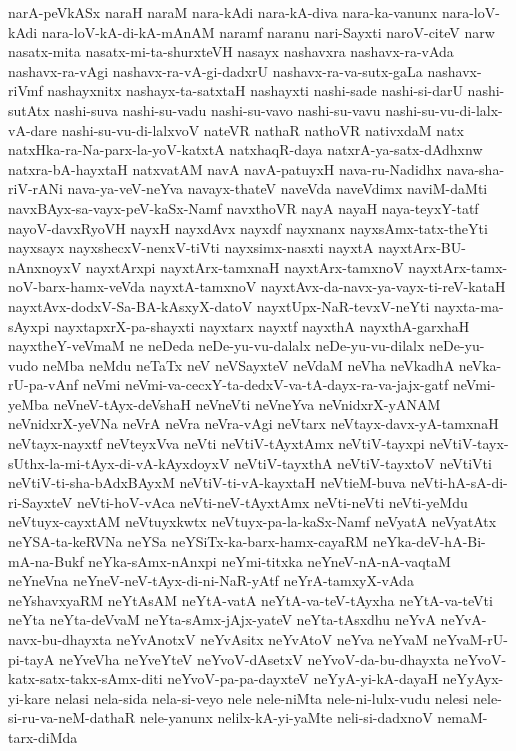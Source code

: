 {narA-peVkASx
naraH
naraM
nara-kAdi
nara-kA-diva
nara-ka-vanunx
nara-loV-kAdi
nara-loV-kA-di-kA-mAnAM
naramf
naranu
nari-Sayxti
naroV-citeV
narw
nasatx-mita
nasatx-mi-ta-shurxteVH
nasayx
nashavxra
nashavx-ra-vAda
nashavx-ra-vAgi
nashavx-ra-vA-gi-dadxrU
nashavx-ra-va-sutx-gaLa
nashavx-riVmf
nashayxnitx
nashayx-ta-satxtaH
nashayxti
nashi-sade
nashi-si-darU
nashi-sutAtx
nashi-suva
nashi-su-vadu
nashi-su-vavo
nashi-su-vavu
nashi-su-vu-di-lalx-vA-dare
nashi-su-vu-di-lalxvoV
nateVR
nathaR
nathoVR
nativxdaM
natx
natxHka-ra-Na-parx-la-yoV-katxtA
natxhaqR-daya
natxrA-ya-satx-dAdhxnw
natxra-bA-hayxtaH
natxvatAM
navA
navA-patuyxH
nava-ru-Nadidhx
nava-sha-riV-rANi
nava-ya-veV-neYva
navayx-thateV
naveVda
naveVdimx
naviM-daMti
navxBAyx-sa-vayx-peV-kaSx-Namf
navxthoVR
nayA
nayaH
naya-teyxY-tatf
nayoV-davxRyoVH
nayxH
nayxdAvx
nayxdf
nayxnanx
nayxsAmx-tatx-theYti
nayxsayx
nayxshecxV-nenxV-tiVti
nayxsimx-nasxti
nayxtA
nayxtArx-BU-nAnxnoyxV
nayxtArxpi
nayxtArx-tamxnaH
nayxtArx-tamxnoV
nayxtArx-tamx-noV-barx-hamx-veVda
nayxtA-tamxnoV
nayxtAvx-da-navx-ya-vayx-ti-reV-kataH
nayxtAvx-dodxV-Sa-BA-kAsxyX-datoV
nayxtUpx-NaR-tevxV-neYti
nayxta-ma-sAyxpi
nayxtapxrX-pa-shayxti
nayxtarx
nayxtf
nayxthA
nayxthA-garxhaH
nayxtheY-veVmaM
ne
neDeda
neDe-yu-vu-dalalx
neDe-yu-vu-dilalx
neDe-yu-vudo
neMba
neMdu
neTaTx
neV
neVSayxteV
neVdaM
neVha
neVkadhA
neVka-rU-pa-vAnf
neVmi
neVmi-va-cecxY-ta-dedxV-va-tA-dayx-ra-va-jajx-gatf
neVmi-yeMba
neVneV-tAyx-deVshaH
neVneVti
neVneYva
neVnidxrX-yANAM
neVnidxrX-yeVNa
neVrA
neVra
neVra-vAgi
neVtarx
neVtayx-davx-yA-tamxnaH
neVtayx-nayxtf
neVteyxVva
neVti
neVtiV-tAyxtAmx
neVtiV-tayxpi
neVtiV-tayx-sUthx-la-mi-tAyx-di-vA-kAyxdoyxV
neVtiV-tayxthA
neVtiV-tayxtoV
neVtiVti
neVtiV-ti-sha-bAdxBAyxM
neVtiV-ti-vA-kayxtaH
neVtieM-buva
neVti-hA-sA-di-ri-SayxteV
neVti-hoV-vAca
neVti-neV-tAyxtAmx
neVti-neVti
neVti-yeMdu
neVtuyx-cayxtAM
neVtuyxkwtx
neVtuyx-pa-la-kaSx-Namf
neVyatA
neVyatAtx
neYSA-ta-keRVNa
neYSa
neYSiTx-ka-barx-hamx-cayaRM
neYka-deV-hA-Bi-mA-na-Bukf
neYka-sAmx-nAnxpi
neYmi-titxka
neYneV-nA-nA-vaqtaM
neYneVna
neYneV-neV-tAyx-di-ni-NaR-yAtf
neYrA-tamxyX-vAda
neYshavxyaRM
neYtAsAM
neYtA-vatA
neYtA-va-teV-tAyxha
neYtA-va-teVti
neYta
neYta-deVvaM
neYta-sAmx-jAjx-yateV
neYta-tAsxdhu
neYvA
neYvA-navx-bu-dhayxta
neYvAnotxV
neYvAsitx
neYvAtoV
neYva
neYvaM
neYvaM-rU-pi-tayA
neYveVha
neYveYteV
neYvoV-dAsetxV
neYvoV-da-bu-dhayxta
neYvoV-katx-satx-takx-sAmx-diti
neYvoV-pa-pa-dayxteV
neYyA-yi-kA-dayaH
neYyAyx-yi-kare
nelasi
nela-sida
nela-si-veyo
nele
nele-niMta
nele-ni-lulx-vudu
nelesi
nele-si-ru-va-neM-dathaR
nele-yanunx
nelilx-kA-yi-yaMte
neli-si-dadxnoV
nemaM-tarx-diMda
}
